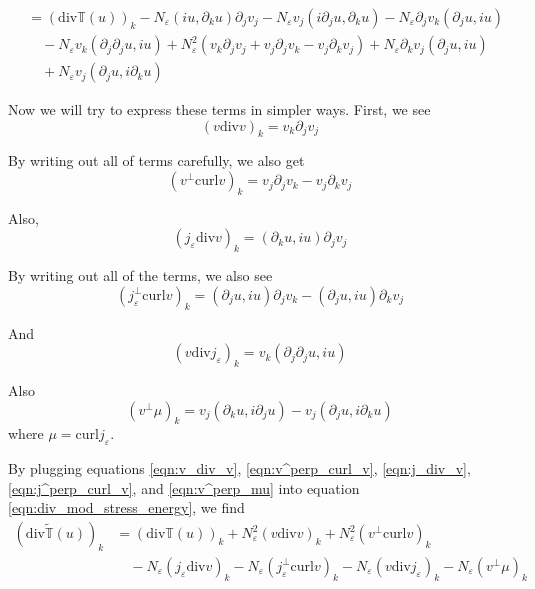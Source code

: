 \documentclass[a4paper]{article}
\renewcommand{\div}{\mathrm{div}}
\newcommand{\curl}{\mathrm{curl}}
\begin{document}
\begin{align}
  &= (\div \mathbb{T}(u))_k - N_\varepsilon (iu, \partial_k u) \partial_j v_j - N_\varepsilon v_j (i \partial_j u, \partial_k u) - N_\varepsilon
  \partial_j v_k (\partial_j u, iu ) \nonumber \\
  &\quad - N_\varepsilon v_k (\partial_j \partial_j u, iu) + N_\varepsilon^2 (v_k \partial_j v_j + v_j \partial_j v_k - v_j \partial_k v_j) +
  N_\varepsilon \partial_k v_j (\partial_j u, iu) \nonumber \\
  &\quad + N_\varepsilon v_j ( \partial_j u, i \partial_k u )
  \label{eqn:div_mod_stress_energy}
\end{align}

Now we will try to express these terms in simpler ways.
First, we see
\begin{equation}
  (v \div v)_k = v_k \partial_j v_j
  \label{eqn:v_div_v}
\end{equation}

By writing out all of terms carefully, we also get
\begin{equation}
  (v^\perp \curl v)_k = v_j \partial_j v_k - v_j \partial_k v_j
  \label{eqn:v^perp_curl_v}
\end{equation}

Also,
\begin{equation}
  (j_\varepsilon \div v)_k = (\partial_k u, i u) \partial_j v_j
  \label{eqn:j_div_v}
\end{equation}

By writing out all of the terms, we also see
\begin{equation}
  (j_\varepsilon^\perp \curl v)_k = (\partial_j u, iu) \partial_j v_k - (\partial_j u, iu) \partial_k v_j
  \label{eqn:j^perp_curl_v}
\end{equation}

And
\begin{equation}
  (v \div j_\varepsilon)_k = v_k (\partial_j \partial_j u, iu)
  \label{eqn:v_div_j}
\end{equation}

Also
\begin{equation}
  (v^\perp \mu)_k = v_j (\partial_k u, i \partial_j u) - v_j ( \partial_j u, i \partial_k u)
  \label{eqn:v^perp_mu}
\end{equation}
where $\mu = \curl j_\varepsilon$.

By plugging equations \eqref{eqn:v_div_v}, \eqref{eqn:v^perp_curl_v}, \eqref{eqn:j_div_v}, \eqref{eqn:j^perp_curl_v}, and \eqref{eqn:v^perp_mu} into
equation \eqref{eqn:div_mod_stress_energy}, we find
\begin{align}
  (\div \tilde{\mathbb{T}}(u))_k &= (\div \mathbb{T}(u))_k + N_\varepsilon^2 (v \div v)_k + N_\varepsilon^2 (v^\perp \curl v)_k \nonumber \\
  &\quad - N_\varepsilon (j_\varepsilon \div v)_k - N_\varepsilon (j_\varepsilon^\perp \curl v)_k - N_\varepsilon (v \div j_\varepsilon)_k - N_\varepsilon (v^\perp \mu)_k
  \label{eqn:simp_div_mod_stress_energy_comp}
\end{align}
\end{document}
